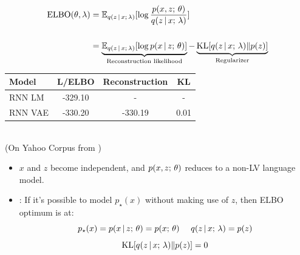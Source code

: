 
\begin{frame}

\vspace{-0.5cm}

\begin{eqnarray*} 
\operatorname*{ELBO}(\theta, \lambda) &=  \mathbb{E}_{q(z \,|\, x ; \, \lambda)}[\log \frac{p( x, z ; \, \theta)}{ q(z \,|\, x ; \, \lambda)}] \\\\
&= \underbrace{\mathbb{E}_{q(z \,|\, x ; \, \lambda)}[\log p( x \,|\, z ; \, \theta)]
}_{\text{Reconstruction likelihood}} - \underbrace{\operatorname*{KL}[q(z \,|\, x ; \, \lambda) \Vert p(z)]}_{\text{Regularizer}} 
\end{eqnarray*}
\center
\vspace{5mm}

\begin{tabular}{l c c c }
\toprule
     Model & L/ELBO & Reconstruction & KL \\
\midrule     
     RNN LM & -329.10 & - & - \\
     RNN VAE & -330.20 & -330.19 & 0.01 \\
\bottomrule
\end{tabular} \\
\vspace{5mm}
(On Yahoo Corpus from \cite{Yang2017}) \\
\end{frame} 

\begin{frame}
\begin{itemize}

  \item $x$ and $z$ become independent, and $p(x, z ; \, \theta)$
    reduces to a non-LV language model.    
    
    \air
    \item \citet{Chen2017}: If it's possible to model $p_\star(x)$ without making use of $z$, then ELBO optimum is at:    
    \[ p_\star(x) = p(x \,|\, z ; \, \theta) = p(x ; \, \theta) \ \ \ \ q(z \,|\, x ; \, \lambda) = p(z) \]
    \[ \operatorname*{KL}[q(z \,|\, x ; \, \lambda) \Vert p(z)] = 0\] 
\end{itemize}
\end{frame} 

